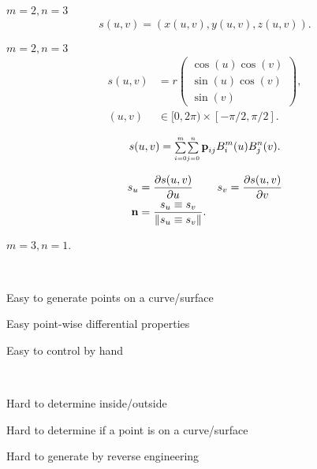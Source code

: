\begin{compactdesc}
	\item[\lp{surfaces}] $m=2,n=3$
		\begin{gather*}
			s(u,v)=(x(u,v),y(u,v),z(u,v)).
		\end{gather*}
	\item[\lp{sphere}] $m=2,n=3$
		\begin{align*}
			s(u,v)&=r
			\!\left(\!\begin{smallmatrix}
				\cos(u)\cos(v)\\
				\sin(u)\cos(v)\\
				\sin(v)
			\end{smallmatrix}\!\right)\!,\\
			(u,v)&\in [0,2\pi)\times [-\pi/2,\pi/2].
		\end{align*}
	\item[\lp{Bezier surfaces}]\mbox\\
		\begin{gather*}
			s(u,v)={\scriptstyle\sum\limits_{i=0}^m}{\scriptstyle\sum\limits_{j=0}^n}\,
			\bm{\mathrm{p}}_{ij}B_{i}^{m}(u)B_{j}^{n}(v).
		\end{gather*}
	\item[\lp{Normal and tangent plane}]
		\begin{align*}
			s_u&=\frac{\partial s(u,v)}{\partial u}&s_v&=\frac{\partial s(u,v)}{\partial v}\\
			\bm{\mathrm{n}}&=\frac{s_u\equiv s_v}{\left\lVert s_u\equiv s_v \right\rVert}.
		\end{align*}
	\item[\lp{Volumetric representations}] $m=3,n=1$.
	\item[\lp{Advantages}] \hfill\\
		\begin{enumerate*}[label=\protect\circled{\arabic*},itemjoin=]
			\item Easy to generate points on a curve/surface\\
			\item Easy point-wise differential properties\\
			\item Easy to control by hand
		\end{enumerate*}
	\item[\lp{Disadvantages}] \hfill\\
		\begin{enumerate*}[label=\protect\circled{\arabic*},itemjoin=]
			\item Hard to determine inside/outside\\
			\item Hard to determine if a point is on a curve/surface\\
			\item Hard to generate by reverse engineering\\
		\end{enumerate*}

\end{compactdesc}
